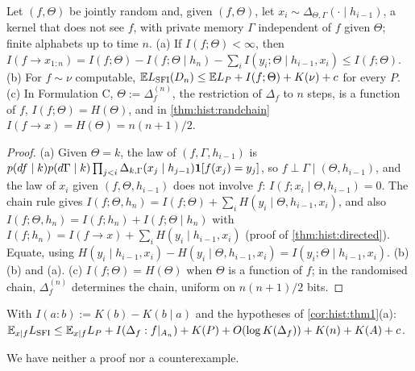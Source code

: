 \begin{proposition}\label{prop:hist:shannon}
Let $(f,\Theta)$ be jointly random and, given $(f,\Theta)$, let $x_i\sim\Delta_{\Theta,\Gamma}(\cdot\mid h_{i-1})$, a kernel that does not see $f$, with private memory $\Gamma$ independent of $f$ given $\Theta$; finite alphabets up to time $n$. (a) If $I(f;\Theta)<\infty$, then $I(f\to x_{1:n})=I(f;\Theta)-I(f;\Theta\mid h_n)-\sum_iI(y_i;\Theta\mid h_{i-1},x_i)\le I(f;\Theta)$. (b) For $f\sim\nu$ computable, $\mathbb{E}L_{\mathrm{SFI}}(D_n)\le\mathbb{E} L_P+I(f;\Theta)+K(\nu)+c$ for every $P$. (c) In Formulation C, $\Theta:=\Delta^{(n)}_f$, the restriction of $\Delta_f$ to $n$ steps, is a function of $f$, $I(f;\Theta)=H(\Theta)$, and in \cref{thm:hist:randchain} $I(f\to x)=H(\Theta)=n(n+1)/2$.
\end{proposition}

\begin{proof}
(a) Given $\Theta=k$, the law of $(f,\Gamma,h_{i-1})$ is $p(df\mid k)p(d\Gamma\mid k)\prod_{j<i}\Delta_{k,\Gamma}(x_j\mid h_{j-1})\mathbf{1}[f(x_j)=y_j]$, so $f\perp\Gamma\mid(\Theta,h_{i-1})$, and the law of $x_i$ given $(f,\Theta,h_{i-1})$ does not involve $f$: $I(f;x_i\mid\Theta,h_{i-1})=0$. The chain rule gives $I(f;\Theta,h_n)=I(f;\Theta)+\sum_iH(y_i\mid\Theta,h_{i-1},x_i)$, and also $I(f;\Theta,h_n)=I(f;h_n)+I(f;\Theta\mid h_n)$ with $I(f;h_n)=I(f\to x)+\sum_iH(y_i\mid h_{i-1},x_i)$ (proof of \cref{thm:hist:directed}). Equate, using $H(y_i\mid h_{i-1},x_i)-H(y_i\mid\Theta,h_{i-1},x_i)=I(y_i;\Theta\mid h_{i-1},x_i)$. (b) (b) and (a). (c) $I(f;\Theta)=H(\Theta)$ when $\Theta$ is a function of $f$; in the randomised chain, $\Delta^{(n)}_f$ determines the chain, uniform on $n(n+1)/2$ bits. %
\end{proof}

\begin{conjecture}\label{conj:hist:algmi}
With $I(a:b):=K(b)-K(b\mid a)$ and the hypotheses of \cref{cor:hist:thm1}(a): $\mathbb{E}_{x\mid f}L_{\mathrm{SFI}}\le\mathbb{E}_{x\mid f}L_P+I(\Delta_f:f|_{A_n})+K(P)+O(\log K(\Delta_f))+K(n)+K(A)+c$.
\end{conjecture}

We have neither a proof nor a counterexample.

\subsection{\SFIhist}\label{app:hist:sfihist}

